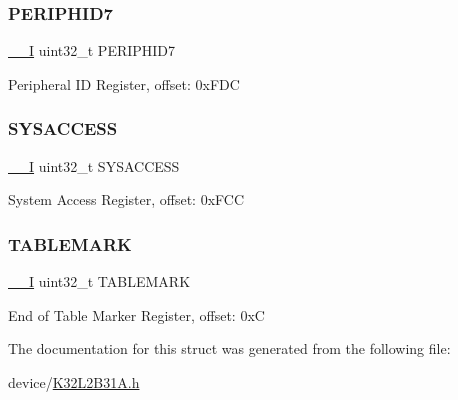 \subsubsection{\texorpdfstring{PERIPHID7}{PERIPHID7}}
{\footnotesize\ttfamily \mbox{\hyperlink{core__cm0plus_8h_af63697ed9952cc71e1225efe205f6cd3}{\+\_\+\+\_\+I}} uint32\+\_\+t P\+E\+R\+I\+P\+H\+I\+D7}

Peripheral ID Register, offset\+: 0x\+F\+DC \mbox{\label{struct_r_o_m___type_a186e457099444315982ffe89d6235393}} 
\subsubsection{\texorpdfstring{SYSACCESS}{SYSACCESS}}
{\footnotesize\ttfamily \mbox{\hyperlink{core__cm0plus_8h_af63697ed9952cc71e1225efe205f6cd3}{\+\_\+\+\_\+I}} uint32\+\_\+t S\+Y\+S\+A\+C\+C\+E\+SS}

System Access Register, offset\+: 0x\+F\+CC \mbox{\label{struct_r_o_m___type_aeabd12dc10a19a2f333e39bb5f329295}} 
\subsubsection{\texorpdfstring{TABLEMARK}{TABLEMARK}}
{\footnotesize\ttfamily \mbox{\hyperlink{core__cm0plus_8h_af63697ed9952cc71e1225efe205f6cd3}{\+\_\+\+\_\+I}} uint32\+\_\+t T\+A\+B\+L\+E\+M\+A\+RK}

End of Table Marker Register, offset\+: 0xC 

The documentation for this struct was generated from the following file\+:\begin{DoxyCompactItemize}
\item 
device/\mbox{\hyperlink{_k32_l2_b31_a_8h}{K32\+L2\+B31\+A.\+h}}\end{DoxyCompactItemize}
